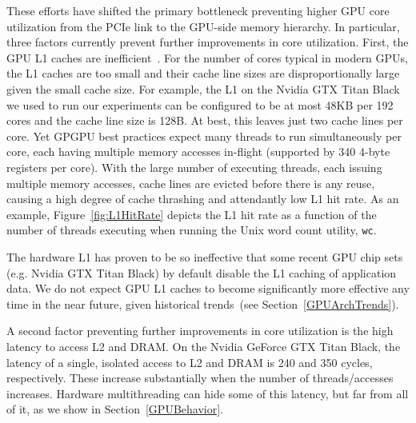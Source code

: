 These efforts have shifted the primary bottleneck preventing higher GPU core utilization from the PCIe link to the GPU-side memory hierarchy.
In particular, three factors currently prevent further improvements in core utilization.
First, the GPU L1 caches are inefficient~\cite{jia2012characterizing}. %
For the number of cores typical in modern GPUs, the L1 caches are too small and their cache line sizes are disproportionally large given the small cache size.
For example,  the L1 on the Nvidia GTX Titan Black we used to run our experiments can be configured to be at most 48KB per 192 cores and the cache line size is 128B.
At best, this leaves just two cache lines per core. 
Yet GPGPU best practices expect many threads to run simultaneously per core, each having multiple memory accesses in-flight (supported by 340 4-byte registers per core).
With the large number of executing threads, each issuing multiple memory accesses, cache lines are evicted before there is any reuse, causing a high degree of cache thrashing and attendantly low L1 hit rate.
As an example, Figure~\ref{fig:L1HitRate} depicts the L1 hit rate as a function of the number of
threads executing when running the Unix word count utility, \texttt{wc}.

The hardware L1 has proven to be so ineffective that some recent GPU chip sets (e.g. Nvidia GTX Titan Black)
by default disable the L1 caching of application data.
We do not expect GPU L1 caches to become significantly more effective any time in the near future, given historical trends~(see Section~\ref{GPUArchTrends}).

A second factor preventing further improvements in core utilization is the high latency to access L2 and  DRAM. 
On the Nvidia GeForce GTX Titan Black, the latency of a single, isolated access to L2 and DRAM is 240 and 350 cycles, respectively. These
increase substantially when the number of threads/accesses increases.
Hardware multithreading can hide some of this latency, but far from all of it, as we show in Section~\ref{GPUBehavior}.

